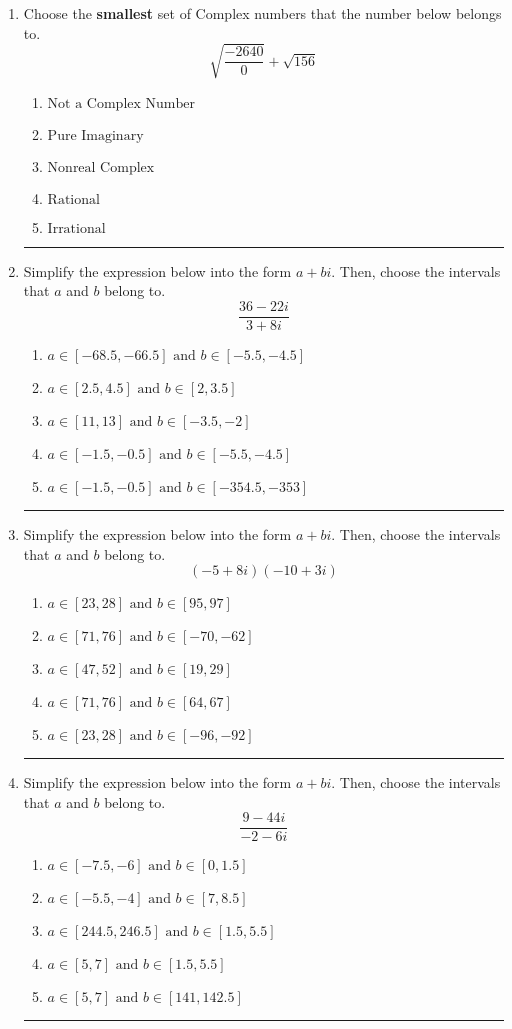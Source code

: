 \documentclass[14pt]{extbook}
\newcommand{\litem}[1]{\item#1\hspace*{-1cm}\rule{\textwidth}{0.4pt}}
\begin{document}
\begin{enumerate}
\litem{
Choose the \textbf{smallest} set of Complex numbers that the number below belongs to.\[ \sqrt{\frac{-2640}{0}}+\sqrt{156} \]\begin{enumerate}[label=\Alph*.]
\item \( \text{Not a Complex Number} \)
\item \( \text{Pure Imaginary} \)
\item \( \text{Nonreal Complex} \)
\item \( \text{Rational} \)
\item \( \text{Irrational} \)

\end{enumerate} }
\litem{
Simplify the expression below into the form $a+bi$. Then, choose the intervals that $a$ and $b$ belong to.\[ \frac{36 - 22 i}{3 + 8 i} \]\begin{enumerate}[label=\Alph*.]
\item \( a \in [-68.5, -66.5] \text{ and } b \in [-5.5, -4.5] \)
\item \( a \in [2.5, 4.5] \text{ and } b \in [2, 3.5] \)
\item \( a \in [11, 13] \text{ and } b \in [-3.5, -2] \)
\item \( a \in [-1.5, -0.5] \text{ and } b \in [-5.5, -4.5] \)
\item \( a \in [-1.5, -0.5] \text{ and } b \in [-354.5, -353] \)

\end{enumerate} }
\litem{
Simplify the expression below into the form $a+bi$. Then, choose the intervals that $a$ and $b$ belong to.\[ (-5 + 8 i)(-10 + 3 i) \]\begin{enumerate}[label=\Alph*.]
\item \( a \in [23, 28] \text{ and } b \in [95, 97] \)
\item \( a \in [71, 76] \text{ and } b \in [-70, -62] \)
\item \( a \in [47, 52] \text{ and } b \in [19, 29] \)
\item \( a \in [71, 76] \text{ and } b \in [64, 67] \)
\item \( a \in [23, 28] \text{ and } b \in [-96, -92] \)

\end{enumerate} }
\litem{
Simplify the expression below into the form $a+bi$. Then, choose the intervals that $a$ and $b$ belong to.\[ \frac{9 - 44 i}{-2 - 6 i} \]\begin{enumerate}[label=\Alph*.]
\item \( a \in [-7.5, -6] \text{ and } b \in [0, 1.5] \)
\item \( a \in [-5.5, -4] \text{ and } b \in [7, 8.5] \)
\item \( a \in [244.5, 246.5] \text{ and } b \in [1.5, 5.5] \)
\item \( a \in [5, 7] \text{ and } b \in [1.5, 5.5] \)
\item \( a \in [5, 7] \text{ and } b \in [141, 142.5] \)


\end{enumerate}}
\end{enumerate}
\end{document}
